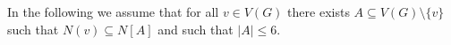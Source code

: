 \documentclass[a4paper,UKenglish,cleveref, autoref, thm-restate]{lipics-v2021}
\begin{document}
%
%
%
%


\begin{tcolorbox}
In the following we assume that for all $v\in V(G)$ there exists
$A\subseteq V(G)\setminus \{v\}$ such that $N(v)\subseteq N[A]$
and such that $|A|\leq 6$.
\end{tcolorbox}
\end{document}
